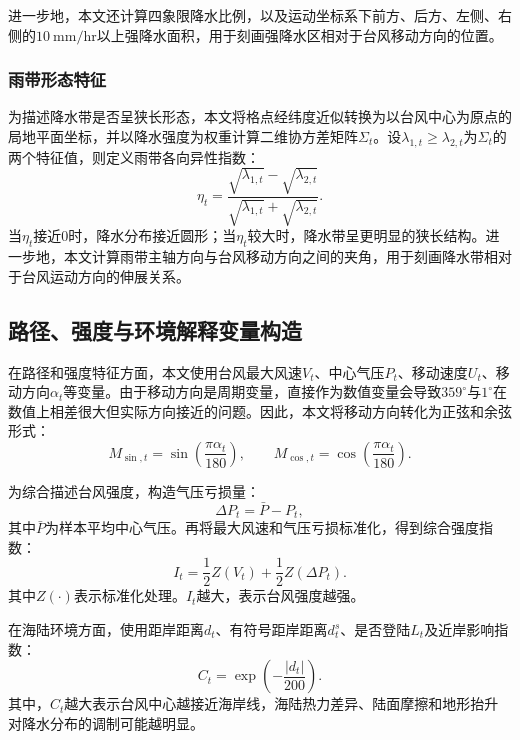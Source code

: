 \documentclass[UTF8,a4paper,zihao=5,fontset=fandol]{ctexart}
\numberwithin{equation}{section}
\numberwithin{figure}{section}
\numberwithin{table}{section}
\begin{document}
进一步地，本文还计算四象限降水比例，以及运动坐标系下前方、后方、左侧、右侧的$10\ \mathrm{mm/hr}$以上强降水面积，用于刻画强降水区相对于台风移动方向的位置。

\subsubsection{雨带形态特征}

为描述降水带是否呈狭长形态，本文将格点经纬度近似转换为以台风中心为原点的局地平面坐标，并以降水强度为权重计算二维协方差矩阵$\Sigma_t$。设$\lambda_{1,t}\geq\lambda_{2,t}$为$\Sigma_t$的两个特征值，则定义雨带各向异性指数：
\begin{equation}
    \eta_t=\frac{\sqrt{\lambda_{1,t}}-\sqrt{\lambda_{2,t}}}
    {\sqrt{\lambda_{1,t}}+\sqrt{\lambda_{2,t}}}.
\end{equation}
当$\eta_t$接近0时，降水分布接近圆形；当$\eta_t$较大时，降水带呈更明显的狭长结构。进一步地，本文计算雨带主轴方向与台风移动方向之间的夹角，用于刻画降水带相对于台风运动方向的伸展关系。

\subsection{路径、强度与环境解释变量构造}

在路径和强度特征方面，本文使用台风最大风速$V_t$、中心气压$P_t$、移动速度$U_t$、移动方向$\alpha_t$等变量。由于移动方向是周期变量，直接作为数值变量会导致$359^\circ$与$1^\circ$在数值上相差很大但实际方向接近的问题。因此，本文将移动方向转化为正弦和余弦形式：
\begin{equation}
    M_{\sin,t}=\sin\left(\frac{\pi\alpha_t}{180}\right),\qquad
    M_{\cos,t}=\cos\left(\frac{\pi\alpha_t}{180}\right).
\end{equation}

为综合描述台风强度，构造气压亏损量：
\begin{equation}
    \Delta P_t=\bar{P}-P_t,
\end{equation}
其中$\bar{P}$为样本平均中心气压。再将最大风速和气压亏损标准化，得到综合强度指数：
\begin{equation}
    I_t=\frac{1}{2}Z(V_t)+\frac{1}{2}Z(\Delta P_t).
\end{equation}
其中$Z(\cdot)$表示标准化处理。$I_t$越大，表示台风强度越强。

在海陆环境方面，使用距岸距离$d_t$、有符号距岸距离$d_t^s$、是否登陆$L_t$及近岸影响指数：
\begin{equation}
    C_t=\exp\left(-\frac{|d_t|}{200}\right).
\end{equation}
其中，$C_t$越大表示台风中心越接近海岸线，海陆热力差异、陆面摩擦和地形抬升对降水分布的调制可能越明显。
\end{document}
